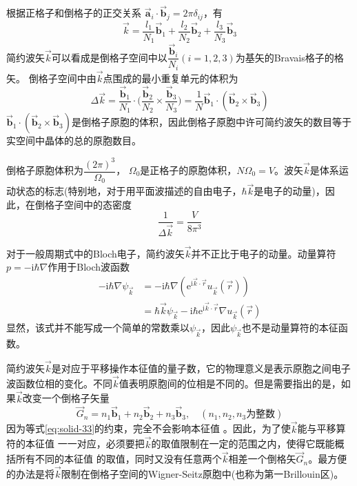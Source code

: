 根据正格子和倒格子的正交关系%
$\vec{\mathbf a}_i\cdot\vec{\mathbf b}_j=2\pi\delta_{ij}$，有
\begin{equation}
  \vec k=\dfrac{l_1}{N_1}\vec{\mathbf b}_1+\dfrac{l_2}{N_2}\vec{\mathbf b}_2+\dfrac{l_3}{N_3}\vec{\mathbf b}_3
  \label{eq:solid-36}
\end{equation}
简约波矢$\vec k$可以看成是倒格子空间中以$\dfrac{\vec{\mathbf b}_i}{N_i}(i=1,2,3)$为基矢的\textrm{Bravais}格子的格矢。
倒格子空间中由$\vec k$点围成的最小重复单元的体积为
\begin{equation}
  \Delta\vec k=\dfrac{\vec{\mathbf b}_1}{N_1}\cdot\biggl(\dfrac{\vec{\mathbf b}_2}{N_2}\times\dfrac{\vec{\mathbf b}_3}{N_3}\biggr)=\dfrac1N\vec{\mathbf b}_1\cdot(\vec{\mathbf b}_2\times\vec{\mathbf b}_3)
  \label{eq:solid-37}
\end{equation}
$\vec{\mathbf b}_1\cdot(\vec{\mathbf b}_2\times\vec{\mathbf b}_3)$是倒格子原胞的体积，因此倒格子原胞中许可简约波矢的数目等于实空间中晶体的总的原胞数目。

倒格子原胞体积为$\dfrac{(2\pi)^3}{\Omega_0}$，%
$\Omega_0$是正格子的原胞体积，$N\Omega_0=V$。波矢$\vec k$是体系运动状态的标志(特别地，对于用平面波描述的自由电子，$\hbar\vec k$是电子的动量\cite{Yanshousheng})，因此，在倒格子空间中的态密度
\begin{equation}
  \dfrac1{\Delta\vec k}=\dfrac V{8\pi^3}
  \label{eq:solid-38}
\end{equation}

对于一般周期式中的\textrm{Bloch}电子，简约波矢$\vec k$并不正比于电子的动量。动量算符$p=-\mathrm{i}\hbar\nabla$作用于\textrm{Bloch}波函数%
\begin{equation}
  \begin{split}
	  -\mathrm{i}\hbar\nabla\psi_{\vec k}&=-\mathrm{i}\hbar\nabla(\mathrm{e}^{\mathrm{i}\vec k\cdot\vec r}u_{\vec k}(\vec r))\\
	  &=\hbar\vec k\psi_{\vec k}-\mathrm{i}\hbar \mathrm{e}^{\mathrm{i}\vec k\cdot\vec r}\nabla u_{\vec k}(\vec r)
  \end{split}
  \label{eq:solid-39}
\end{equation}
显然，该式并不能写成一个简单的常数乘以$\psi_{\vec k}$，因此$\psi_{\vec k}$也不是动量算符的本征函数。

简约波矢$\vec k$是对应于平移操作本征值的量子数，它的物理意义是表示原胞之间电子波函数位相的变化。不同$\vec k$值表明原胞间的位相是不同的。但是需要指出的是，如果$\vec k$改变一个倒格子矢量
\begin{displaymath}
  \vec G_n=n_1\vec{\mathbf b}_1+n_2\vec{\mathbf b}_2+n_3\vec{\mathbf b}_3,\quad(n_1,n_2,n_3\mbox{为整数})
\end{displaymath}
因为等式\eqref{eq:solid-33}的约束，完全不会影响本征值%
。因此，为了使$\vec k$能与平移算符的本征值%
一一对应，必须要把$\vec k$的取值限制在一定的范围之内，使得它既能概括所有不同的本征值%
的取值，同时又没有任意两个$\vec k$相差一个倒格矢$\vec G_n$。最方便的办法是将$\vec k$限制在倒格子空间的\textrm{Wigner-Seitz}原胞中(也称为第一\textrm{Brillouin}区)。

